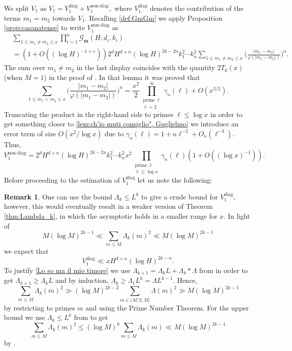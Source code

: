 \documentclass[reqno, 11pt]{amsart}
\numberwithin{equation}{section}
\theoremstyle{definition}
\newtheorem{remark}[theorem]{Remark}
\renewcommand{\phi}{\varphi}
\newcommand{\0}{\mathbf{0}}
\renewcommand{\leq}{\leqslant}
\renewcommand{\geq}{\geqslant}
\renewcommand{\epsilon}{\varepsilon}
\renewcommand{\leq}{\leqslant}
\renewcommand{\geq}{\geqslant}
\renewcommand{\#}{\sharp}
\begin{document}
We split $V_1$ as  $V_1= V_1^{\textrm{diag}}+V_1^{\textrm{non-diag}},$ where $V_1^{\textrm{diag}} $ denotes the contribution of the terms $m_1=m_2$ towards $V_1$. Recalling  \eqref{def:GmGm} we apply Proposition \ref{prop:casanatense} to write  
$V_1^{\textrm{non-diag}}$ as \begin{align*} &\sum_{1\leq m_1\neq m_2\leq x }  \prod_{i=1}^n  \mathcal G_{\mathbf m}(H;d_i,k_i)\\
 &=\left(1+ O (    (\log H )^{- 1+ \epsilon} )\right)  2^d H^{d+n}  (\log H)^{2k-2n} k_1^2\cdots k_n^2
\sum_{1\leq m_1\neq m_2\leq x }  \Big( \frac{|m_1-m_2|}{\phi(|m_1-m_2|)}  \Big)^n .\end{align*}   The sum over $m_1 \neq m_2$ in 
the last display  coincides with  the quantity    $2T_0(x)$ (when $M=1$) in the proof  of \cite[Lemma 4.4]{MR4542704}. In that lemma it was proved that  $$\sum_{1\leq m_1< m_2\leq x }  \Big( \frac{|m_1-m_2|}{\phi(|m_1-m_2|)}  \Big)^n= \frac{x^2}{2}
\prod_{\substack{\mathrm{prime } \ \ell  \\  \ell =2 }}^\infty  \gamma_n(\ell) +O(x^{3/2}).$$ Truncating the product in the 
right-hand side to primes  $\ell \leq \log x $ in order to get something closer to \eqref{lem:ch'io muti consiglio", Guglielmo} we introduce  an error term of size $O(x^2/\log x)$ due to $\gamma_n(\ell)=1+n \ell^{-2} +O_n(\ell^{-3})$. Thus, 
\begin{equation}\label{Dunque si sfoga}V_1^{\textrm{non-diag}} =  2^d H^{d+n}  (\log H)^{2k-2n} k_1^2\cdots k_n^2 x^2
\prod_{\substack{\mathrm{prime } \ \ell \\  \ell \leq  \log x}} \gamma_n(\ell)\left(1+ O (    (\log x)^{- 1 } )\right).\end{equation}
Before proceeding to the estimation of $V_1^{\textrm{diag}}$ let us note the following: \begin{remark}\label{Vivrai ma sempre in guerra}
One  can use the bound $\Lambda_k\leq L^k$ to give a crude bound for $V_1^{\textrm{diag}}$, however, this would eventually result in a weaker version of Theorem \ref{thm:Lambda_k}, in which the asymptotic holds in a smaller range for $x$. In light of \begin{equation}\label{Lo so ma il mio timore} M (\log M)^{2k-1} \ll \sum_{m\leq M } \Lambda_k(m) ^2\ll M
(\log M)^{2k-1}\end{equation} we expect that \begin{equation}\label{Misero! In quale abisso}
V_1^{\textrm{diag}}\ll x H^{d+n} (\log H)^{2k-n}.\end{equation} To justify \eqref{Lo so ma il mio timore} we use 
$\Lambda_{k+1}=\Lambda_k L+ \Lambda_k \ast \Lambda$ from \cite[Equation (3.15)]{MR2647984} in order to get 
$\Lambda_{k+1}\geq \Lambda_k L$ and by induction,  $\Lambda_{k}\geq \Lambda_1 L^k=\Lambda L^{k-1}$. Hence,
$$ \sum_{m\leq M } \Lambda_k(m) ^2 \gg (\log M)^{2k-2}  \sum_{m \in (M/2,M] }   \Lambda(m) ^2  \gg M (\log M)^{2k-1}
 $$   by restricting to primes $m$ and using  the Prime Number Theorem.  For the upper bound   we use   $  \Lambda_k \leq L^k$
  from \cite[Equation (3.16)]{MR2647984}   to get   $$ \sum_{m\leq M } \Lambda_k(m) ^2\leq  (\log M)^k\sum_{m\leq M } \Lambda_k(m) 
\ll M (\log M)^{2k-1}$$ by \cite[Equation (3.21)]{MR2647984}.\end{remark} 
\end{document}

